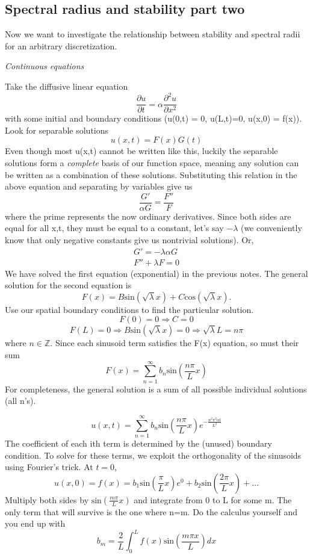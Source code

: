 \documentclass[11pt]{article}
\begin{document}
\subsection{Spectral radius and stability part two}
Now we want to investigate the relationship between stability and spectral radii for an arbitrary discretization.

\emph{Continuous equations}

Take the diffusive linear equation
\begin{equation}
\frac{\partial u}{\partial t} = \alpha \frac{\partial^2 u}{\partial x^2}
\end{equation}
with some initial and boundary conditions (u(0,t) = 0, u(L,t)=0, u(x,0) = f(x)). Look for separable solutions 
$$ u(x,t) = F(x)G(t) $$ 
Even though most u(x,t) cannot be written like this, luckily the separable solutions form a \emph{complete} basis of our function space, meaning any solution can be written as a combination of these solutions. 
Substituting this relation in the above equation and separating by variables give us
$$ \frac{G'}{\alpha G} = \frac{F''}{F} $$ where the prime represents the now ordinary derivatives. Since both sides are equal for all x,t, they must be equal to a constant, let's say $-\lambda$ (we conveniently know that only negative constants give us nontrivial solutions). Or, 
\begin{eqnarray}
G' = -\lambda \alpha G  \\
F'' + \lambda F = 0
\end{eqnarray}
We have solved the first equation (exponential) in the previous notes. The general solution for the second equation is
\begin{equation}
F(x) = B\text{sin}(\sqrt{\lambda} x) + C\text{cos}(\sqrt{\lambda} x).
\end{equation}
Use our spatial boundary conditions to find the particular solution.
$$ F(0) = 0\Rightarrow C = 0 $$
$$ F(L) = 0 \Rightarrow B\text{sin}(\sqrt{\lambda} x) = 0 \Rightarrow \sqrt{\lambda} L = n\pi$$
where $n \in \mathbb{Z}$. Since each sinusoid term satisfies the F(x) equation, so must their sum
$$ F(x) = \sum_{n=1}^{\infty} b_n \text{sin}(\frac{n\pi}{L}x) $$
For completeness, the general solution is a sum of all possible individual solutions (all n's). 

$$ u(x,t) = \sum_{n=1}^{\infty} b_n \text{sin}(\frac{n\pi}{L}x)e^{-\frac{n^2\pi^2\alpha t}{L^2}}$$
The coefficient of each ith term is determined by the (unused) boundary condition. To solve for these terms, we exploit the orthogonality of the sinusoids using Fourier's trick. At $t=0$,
$$ u(x,0) = f(x) = b_1\text{sin}(\frac{\pi}{L}x)e^0 + b_2\text{sin}(\frac{2\pi}{L}x) + \ldots $$
Multiply both sides by $\text{sin}(\frac{m\pi}{L}x)$ and integrate from 0 to L for some m. The only term that will survive is the one where n=m. Do the calculus yourself and you end up with
$$ b_m = \frac{2}{L}\int_0^L f(x)\text{sin}(\frac{m\pi x}{L}) dx $$
\end{document}
